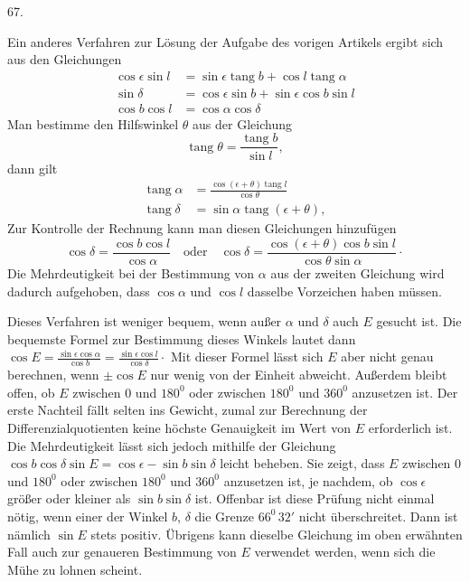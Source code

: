 \par\medskip
\hypertarget{native-086-article067}{}
\begin{center}67.\end{center}
Ein anderes Verfahren zur Lösung der Aufgabe des vorigen Artikels ergibt sich aus den Gleichungen\HistoricalNoteEight{Handschriftliche Bemerkung:]
\[
\begin{aligned}
\sin\alpha\cos\delta&=-\sin\epsilon\sin b+\cos\epsilon\cos b\sin l\\[.35em]
\cos\alpha\cos\delta&=\cos b\cos l\\[.35em]
\sin\delta&=\cos\epsilon\sin b+\sin\epsilon\cos b\sin l.
\end{aligned}
\]
}
\[
\begin{aligned}
\cos\epsilon\sin l&=\sin\epsilon\operatorname{tang}b+\cos l\operatorname{tang}\alpha\\[.4em]
\sin\delta&=\cos\epsilon\sin b+\sin\epsilon\cos b\sin l\\[.4em]
\cos b\cos l&=\cos\alpha\cos\delta
\end{aligned}
\]
Man bestimme den Hilfswinkel $\theta$ aus der Gleichung
\[
\operatorname{tang}\theta=\frac{\operatorname{tang}b}{\sin l},
\]
dann gilt
\[
\begin{aligned}
\operatorname{tang}\alpha&=\frac{\cos(\epsilon+\theta)\operatorname{tang}l}{\cos\theta}\\[.6em]
\operatorname{tang}\delta&=\sin\alpha\operatorname{tang}(\epsilon+\theta),
\end{aligned}
\]
Zur Kontrolle der Rechnung kann man diesen Gleichungen hinzufügen
\[
\cos\delta=\frac{\cos b\cos l}{\cos\alpha}\quad\text{oder}\quad
\cos\delta=\frac{\cos(\epsilon+\theta)\cos b\sin l}{\cos\theta\sin\alpha}\cdot
\]
Die Mehrdeutigkeit bei der Bestimmung von $\alpha$ aus der zweiten Gleichung wird dadurch aufgehoben, dass $\cos\alpha$ und $\cos l$ dasselbe Vorzeichen haben müssen.

Dieses Verfahren ist weniger bequem, wenn außer $\alpha$ und $\delta$ auch $E$ gesucht ist. Die bequemste Formel zur Bestimmung dieses Winkels lautet dann $\cos E=\frac{\sin\epsilon\cos\alpha}{\cos b}=\frac{\sin\epsilon\cos l}{\cos\delta}\cdot$ Mit dieser Formel lässt sich $E$ aber nicht genau berechnen, wenn $\pm\cos E$ nur wenig von der Einheit abweicht. Außerdem bleibt offen, ob $E$ zwischen $0$ und $180^0$ oder zwischen $180^0$ und $360^0$ anzusetzen ist. Der erste Nachteil fällt selten ins Gewicht, zumal zur Berechnung der Differenzialquotienten keine höchste Genauigkeit im Wert von $E$ erforderlich ist. Die Mehrdeutigkeit lässt sich jedoch mithilfe der Gleichung $\cos b\cos\delta\sin E=\cos\epsilon-\sin b\sin\delta$ leicht beheben. Sie zeigt, dass $E$ zwischen $0$ und $180^0$ oder zwischen $180^0$ und $360^0$ anzusetzen ist, je nachdem, ob $\cos\epsilon$ größer oder kleiner als $\sin b\sin\delta$ ist. Offenbar ist diese Prüfung nicht einmal nötig, wenn einer der Winkel $b$, $\delta$ die Grenze $66^0\,32'$ nicht überschreitet. Dann ist nämlich $\sin E$ stets positiv. Übrigens kann dieselbe Gleichung im oben erwähnten Fall auch zur genaueren Bestimmung von $E$ verwendet werden, wenn sich die Mühe zu lohnen scheint.
